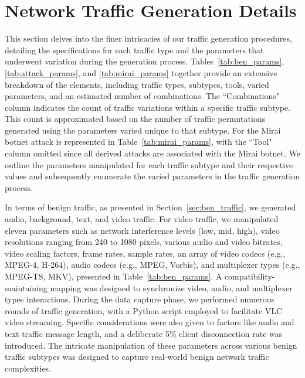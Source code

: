 \documentclass[lettersize,journal]{IEEEtran}
\begin{document}
\section{Network Traffic Generation Details}\label{sec:appendix_diversification}
This section delves into the finer intricacies of our traffic generation procedures, detailing the specifications for each traffic type and the parameters that underwent variation during the generation process. Tables~\ref{tab:ben_params}, \ref{tab:attack_params}, and \ref{tab:mirai_params} together provide an extensive breakdown of the elements, including traffic types, subtypes, tools, varied parameters, and an estimated number of combinations. The ``Combinations" column indicates the count of traffic variations within a specific traffic subtype. This count is approximated based on the number of traffic permutations generated using the parameters varied unique to that subtype. For the Mirai botnet attack is represented in Table~\ref{tab:mirai_params}, with the ``Tool" column omitted since all derived attacks are associated with the Mirai botnet. We outline the parameters manipulated for each traffic subtype and their respective values and subsequently enumerate the varied parameters in the traffic generation process. 

In terms of benign traffic, as presented in Section~\ref{sec:ben_traffic}, we generated audio, background, text, and video traffic. For video traffic, we manipulated eleven parameters such as network interference levels (low, mid, high), video resolutions ranging from 240 to 1080 pixels, various audio and video bitrates, video scaling factors, frame rates, sample rates, an array of video codecs (e.g., MPEG-4, H-264), audio codecs (e.g., MPEG, Vorbis), and multiplexer types (e.g., MPEG-TS, MKV), presented in Table~\ref{tab:ben_params}. A compatibility-maintaining mapping was designed to synchronize video, audio, and multiplexer types interactions. During the data capture phase, we performed numerous rounds of traffic generation, with a Python script employed to facilitate \ac{VLC} video streaming. Specific considerations were also given to factors like audio and text traffic message length, and a deliberate 5\% client disconnection rate was introduced. The intricate manipulation of these parameters across various benign traffic subtypes was designed to capture real-world benign network traffic complexities.
\end{document}
